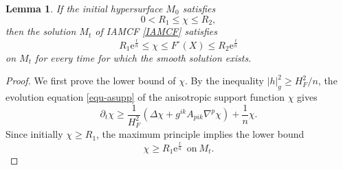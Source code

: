 \documentclass[11pt,reqno]{amsart}
\newtheorem{lemma}[proposition]{Lemma}
\theoremstyle{definition}
\theoremstyle{remark}
\numberwithin{equation}{section}
\begin{document}
	\begin{lemma}
		\label{lem-anisosupp}
		If the initial hypersurface $M_0$ satisfies
		\begin{equation*}
			0 < R_1 \leq \chi \leq R_2,
		\end{equation*}
		then the solution $M_t$ of IAMCF \eqref{IAMCF} satisfies
		\begin{equation}
			\label{equ-asest}
			R_1 \mathrm{e}^{\frac{t}{n}} \leq \chi \leq F^{\circ}(X) \leq R_2 \mathrm{e}^{\frac{t}{n}}
		\end{equation}
		on $M_t$ for every time for which the smooth solution exists.
	\end{lemma}
	
	\begin{proof}
		We first prove the lower bound of $\chi$. By the inequality $|h|_{g}^2\geq {H_F^2}/{n}$,  the evolution equation \eqref{equ-asupp} of the anisotropic support function $\chi$ gives
		\begin{equation*}
			\partial_t \chi \geq \dfrac{1}{H_F^2}\left( \Delta \chi + g^{ik}A_{pik}\nabla^p \chi \right) + \dfrac{1}{n} \chi.
		\end{equation*}
		Since initially $\chi\geq R_1$, the maximum principle implies the lower bound
		\begin{equation*}
			\chi\geq R_1\mathrm{e}^{\frac{t}{n}}\ \ \mbox{on}\  M_t.
		\end{equation*}
		

\end{proof}
\end{document}
